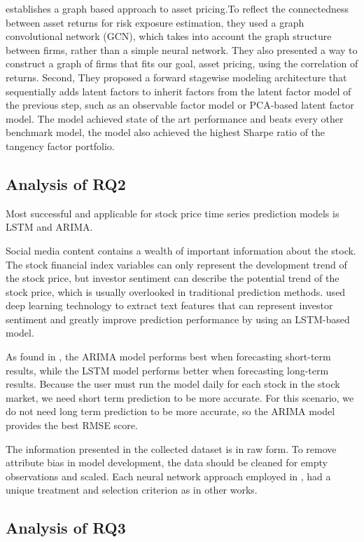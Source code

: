 \documentclass[11pt]{article}
\begin{document}
\cite{son2022} establishes a graph based approach to asset pricing.To reflect the connectedness between asset returns for risk exposure estimation, they used a graph convolutional network (GCN), which takes into account the graph structure between firms, rather than a simple neural network. They also presented a way to construct a graph of firms that fits our goal, asset pricing, using the correlation of returns. Second, They proposed a forward stagewise modeling architecture that sequentially adds latent factors to inherit factors from the latent factor model of the previous step, such as an observable factor model or PCA-based latent factor model. The model achieved state of the art performance and beats every other benchmark model, the model also achieved the highest Sharpe ratio of the tangency factor portfolio.

\subsection{Analysis of RQ2}\label{S:analysisRQ2}
Most successful and applicable for stock price time series prediction models is LSTM and ARIMA.

Social media content contains a wealth of important information about the stock. The stock financial index variables can only represent the development trend of the stock price, but investor sentiment can describe the potential trend of the stock price, which is usually overlooked in traditional prediction methods. \cite{Huan2020} used deep learning technology to extract text features that can represent investor sentiment and greatly improve prediction performance by using an LSTM-based model.

As found in \cite{Mehta2021}, the ARIMA model performs best when forecasting short-term results, while the LSTM model performs better when forecasting long-term results. Because the user must run the model daily for each stock in the stock market, we need short term prediction to be more accurate. For this scenario, we do not need long term prediction to be more accurate, so the ARIMA model provides the best RMSE score.

The information presented in the collected dataset is in raw form. To remove attribute bias in model development, the data should be cleaned for empty observations and scaled. Each neural network approach employed in \cite{AlAradi2020}, had a unique treatment and selection criterion as in other works.

\subsection{Analysis of RQ3}\label{S:analysisRQ3}
\end{document}

